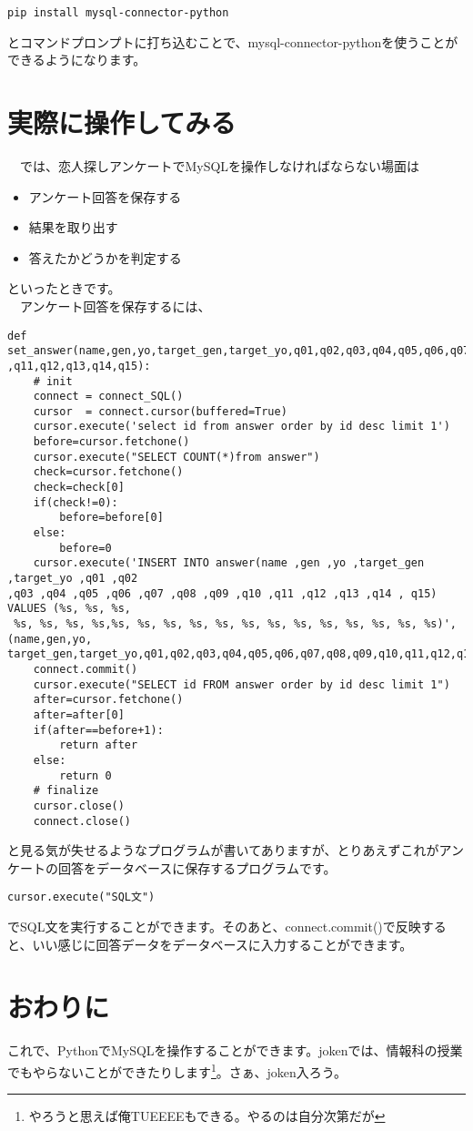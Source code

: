 \documentclass{jsarticle}
\begin{document}
\begin{lstlisting}[basicstyle=\ttfamily\footnotesize, frame=single]
pip install mysql-connector-python
\end{lstlisting}
とコマンドプロンプトに打ち込むことで、mysql-connector-pythonを使うことができるようになります。
\section{実際に操作してみる}
　では、恋人探しアンケートでMySQLを操作しなければならない場面は
\begin{itemize}
\item アンケート回答を保存する
\item 結果を取り出す
\item 答えたかどうかを判定する
\end{itemize}
といったときです。\\
　アンケート回答を保存するには、
\begin{lstlisting}[basicstyle=\ttfamily\footnotesize, frame=single]
def set_answer(name,gen,yo,target_gen,target_yo,q01,q02,q03,q04,q05,q06,q07,q08,q09,q10
,q11,q12,q13,q14,q15):
    # init
    connect = connect_SQL()
    cursor  = connect.cursor(buffered=True)
    cursor.execute('select id from answer order by id desc limit 1')
    before=cursor.fetchone()
    cursor.execute("SELECT COUNT(*)from answer")
    check=cursor.fetchone()
    check=check[0]
    if(check!=0):
        before=before[0]
    else:
        before=0
    cursor.execute('INSERT INTO answer(name ,gen ,yo ,target_gen ,target_yo ,q01 ,q02
,q03 ,q04 ,q05 ,q06 ,q07 ,q08 ,q09 ,q10 ,q11 ,q12 ,q13 ,q14 , q15) VALUES (%s, %s, %s,
 %s, %s, %s, %s,%s, %s, %s, %s, %s, %s, %s, %s, %s, %s, %s, %s, %s)',(name,gen,yo,
target_gen,target_yo,q01,q02,q03,q04,q05,q06,q07,q08,q09,q10,q11,q12,q13,q14,q15));
    connect.commit()
    cursor.execute("SELECT id FROM answer order by id desc limit 1")
    after=cursor.fetchone()
    after=after[0]
    if(after==before+1):
        return after
    else:
        return 0
    # finalize
    cursor.close()
    connect.close()
\end{lstlisting}
と見る気が失せるようなプログラムが書いてありますが、とりあえずこれがアンケートの回答をデータベースに保存するプログラムです。
\begin{lstlisting}[basicstyle=\ttfamily\footnotesize, frame=single]
cursor.execute("SQL文")
\end{lstlisting}
でSQL文を実行することができます。そのあと、connect.commit()で反映すると、いい感じに回答データをデータベースに入力することができます。
\section{おわりに}
これで、PythonでMySQLを操作することができます。jokenでは、情報科の授業でもやらないことができたりします\footnote{やろうと思えば俺TUEEEEもできる。やるのは自分次第だが}。さぁ、joken入ろう。
\end{document}
